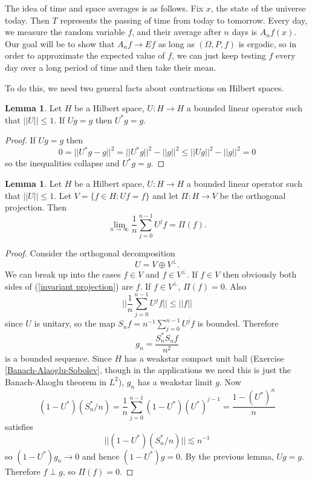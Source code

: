 \documentclass[12pt]{book}
\theoremstyle{definition}
\newtheorem{lemma}[theorem]{Lemma}
\begin{document}
The idea of time and space averages is as follows. Fix $x$, the state of the universe today. Then $T$ represents the passing of time from today to tomorrow.
Every day, we measure the random variable $f$, and their average after $n$ days is $A_nf(x)$.
Our goal will be to show that $A_nf \to Ef$ as long as $(\Omega, P, f)$ is ergodic, so in order to approximate the expected value of $f$, we can just keep testing $f$ every day over a long period of time and then take their mean.

To do this, we need two general facts about contractions on Hilbert spaces.
\begin{lemma}
Let $H$ be a Hilbert space, $U: H \to H$ a bounded linear operator such that $||U|| \leq 1$.
If $Ug = g$ then $U^*g = g$.
\end{lemma}
\begin{proof}
If $Ug = g$ then
$$0 = ||U^*g - g||^2 = ||U^*g||^2 - ||g||^2 \leq ||Ug||^2 - ||g||^2 = 0$$
so the inequalities collapse and $U^*g = g$.
\end{proof}

\begin{lemma}
Let $H$ be a Hilbert space, $U: H \to H$ a bounded linear operator such that $||U|| \leq 1$.
Let $V = \{f \in H: Uf = f\}$ and let $\Pi: H \to V$ be the orthogonal projection. Then
\begin{equation}
\label{invariant projection}
\lim_{n \to \infty} \frac{1}{n} \sum_{j=0}^{n-1} U^jf = \Pi(f).
\end{equation}
\end{lemma}
\begin{proof}
Consider the orthogonal decomposition
$$U = V \oplus V^\perp.$$
We can break up into the cases $f \in V$ and $f \in V^\perp$.
If $f \in V$ then obviously both sides of (\ref{invariant projection}) are $f$.
If $f \in V^\perp$, $\Pi(f) = 0$.
Also
$$||\frac{1}{n} \sum_{j=0}^{n-1} U^jf|| \leq ||f||$$
since $U$ is unitary, so the map $S_nf = n^{-1} \sum_{j=0}^{n-1} U^jf$ is bounded.
Therefore
$$g_n = \frac{S_n^*S_nf}{n^2}$$
is a bounded sequence. Since $H$ has a weakstar compact unit ball (Exercise \ref{Banach-Alaoglu-Sobolev}, though in the applications we need this is just the Banach-Alaoglu theorem in $L^2$), $g_n$ has a weakstar limit $g$.
Now
$$(1 - U^*)(S_n^*/n) = \frac{1}{n} \sum_{j=0}^{n-1} (1 - U^*)(U^*)^{j-1} = \frac{1 - (U^*)^n}{n}$$
satisfies
$$||(1 - U^*)(S_n^*/n)|| \lesssim n^{-1}$$
so $(1 - U^*)g_n \to 0$ and hence $(1 - U^*)g = 0$.
By the previous lemma, $Ug = g$. Therefore $f \perp g$, so $\Pi(f) = 0$.
\end{proof}
\end{document}
